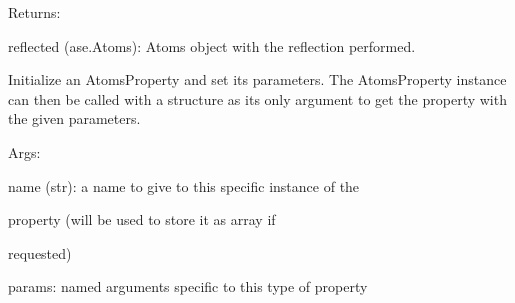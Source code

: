 \documentclass[letterpaper,10pt,english]{sphinxmanual}
\begin{document}
\begin{fulllineitems}
\begin{DUlineblock}{0em}
\item[] Returns:
\item[]
\begin{DUlineblock}{\DUlineblockindent}
\item[] reflected (ase.Atoms): Atoms object with the reflection performed.
\end{DUlineblock}
\end{DUlineblock}

Initialize an AtomsProperty and set its parameters.
The AtomsProperty instance can then be called with a structure as its
only argument to get the property with the given parameters.

\begin{DUlineblock}{0em}
\item[] Args:
\item[]
\begin{DUlineblock}{\DUlineblockindent}
\item[] name (str): a name to give to this specific instance of the
\item[]
\begin{DUlineblock}{\DUlineblockindent}
\item[] property (will be used to store it as array if
\item[] requested)
\end{DUlineblock}
\item[] params: named arguments specific to this type of property
\end{DUlineblock}
\end{DUlineblock}

\begin{fulllineitems}
\label{doctree/soprano.properties.transform.transform:soprano.properties.transform.transform.Mirror.default_name}
\end{fulllineitems}


\begin{fulllineitems}
\label{doctree/soprano.properties.transform.transform:soprano.properties.transform.transform.Mirror.default_params}
\end{fulllineitems}


\begin{fulllineitems}
\label{doctree/soprano.properties.transform.transform:soprano.properties.transform.transform.Mirror.extract}
\end{fulllineitems}


\end{fulllineitems}
\end{document}
